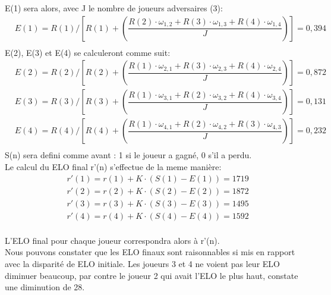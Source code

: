 \documentclass[11pt,a4paper,titlepage]{article}
\begin{document}
        E(1) sera alors, avec J le nombre de joueurs adversaires (3): 
        \begin{equation}
            \begin{split}
                & E(1) = R(1) / [R(1) + (\dfrac{R(2) \cdot \omega_{1, 2} + R(3) \cdot \omega_{1, 3} + R(4) \cdot \omega_{1, 4}}{J})] = 0,394 \\
            \end{split}
        \end{equation}
        E(2), E(3) et E(4) se calculeront comme suit:
        \begin{equation}
            \begin{split}
                & E(2) = R(2) / [R(2) + (\dfrac{R(1) \cdot \omega_{2, 1} + R(3) \cdot \omega_{2, 3} + R(4) \cdot \omega_{2,4} }{J})] = 0,872 \\
                & E(3) = R(3) / [R(3) + (\dfrac{R(1) \cdot \omega_{3, 1} + R(2) \cdot \omega_{3, 2} + R(4) \cdot \omega_{3,4} }{J})] = 0,131 \\
                & E(4) = R(4) / [R(4) + (\dfrac{R(1) \cdot \omega_{4, 1} + R(2) \cdot \omega_{4, 2} + R(3) \cdot \omega_{4,3} }{J})] = 0,232 \\
            \end{split}
        \end{equation}
        S(n) sera defini comme avant : 1 si le joueur a gagné, 0 s'il a perdu. \\
        
        Le calcul du ELO final r'(n) s'effectue de la meme manière:
        \begin{equation}
            \begin{split}
                & r'(1) = r(1) + K \cdot (S(1) - E(1)) = 1719 \\
                & r'(2) = r(2) + K \cdot (S(2) - E(2)) = 1872 \\
                & r'(3) = r(3) + K \cdot (S(3) - E(3)) = 1495 \\
                & r'(4) = r(4) + K \cdot (S(4) - E(4)) = 1592 \\
            \end{split}
        \end{equation}

        L'ELO final pour chaque joueur correspondra alors à r'(n). \\
        Nous pouvons constater que les ELO finaux sont raisonnables si mis en rapport avec la disparité de ELO initiale. Les joueurs 3 et
        4 ne voient pas leur ELO diminuer beaucoup, par contre le joueur 2 qui avait l'ELO le plus haut, constate une diminution de 28.
\end{document}
